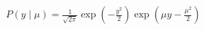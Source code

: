 \documentclass[preview]{standalone}
\begin{document}
\begin{align*}
P(y \mid \mu)= \frac{1}{\sqrt{2 \pi}} \exp (-\frac{y^2}{2}) \exp ( \mu y - \frac{\mu^2}{2} )
\end{align*}
\end{document}
